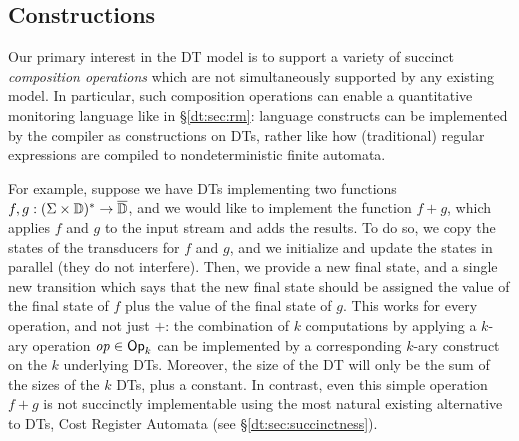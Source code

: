 \subsection{Constructions}
\label{dt:sec:constructions}

Our primary interest in the DT model is to support a variety of succinct \emph{composition operations} which are not simultaneously supported by any existing model. In particular, such composition operations can enable a quantitative monitoring language like \QREpast{} in \S\ref{dt:sec:rm}: language constructs can be implemented by the compiler as constructions on DTs, rather like how (traditional) regular expressions are compiled to nondeterministic finite automata.

For example, suppose we have DTs implementing two functions $f, g: (\Sigma \times \mathbb{D})^{*} \to \overline{\mathbb{D}{}}$, and we would like to implement the function $f + g$, which applies $f$ and $g$ to the input stream and adds the results.
To do so, we copy the states of the transducers for $f$ and $g$,
and we initialize and update the states in parallel (they do not interfere).
Then, we provide a new final state, and a single new transition which says that the new final state should be assigned the value of the final state of $f$ plus the value of the final state of $g$.
This works for every operation, and not just $+$: the combination of $k$ computations by applying a $k$-ary operation $\mathit{op} \in \textsf{Op}_k$ can be implemented by a corresponding $k$-ary construct on the $k$ underlying DTs. Moreover, the size of the DT will only be the sum of the sizes of the $k$ DTs, plus a constant.
In contrast, even this simple operation $f+g$ is not succinctly implementable using the most natural existing alternative to DTs, Cost Register Automata (see \S\ref{dt:sec:succinctness}).

